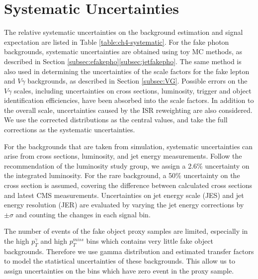 \documentclass[thesis.tex]{subfiles}
\renewcommand\_{\textunderscore\allowbreak}
\begin{document}
\section{Systematic Uncertainties}
The relative systematic uncertainties on the background estimation and signal expectation are listed in Table \ref{table:ch4-systematic}. For the fake photon backgrounds, systematic uncertainties are obtained using toy MC methods, as described in Section \ref{subsec:efakepho}\ref{subsec:jetfakepho}. The same method is also used in determining the uncertainties of the scale factors for the fake lepton and $V\gamma$ backgrounds, as described in Section \ref{subsec:VG}. Possible errors on the $V\gamma$ scales, including uncertainties on cross sections, luminosity, trigger and object identification efficiencies, have been absorbed into the scale factors. In addition to the overall scale, uncertainties caused by the ISR reweighting are also considered. We use the corrected distributions as the central values, and take the full corrections as the systematic uncertainties.

For the backgrounds that are taken from simulation, systematic uncertainties can arise from cross sections, luminosity, and jet energy measurements.  Follow the recommendation of the luminosity study group, we assign a 2.6\% uncertainty on the integrated luminosity. For the rare background, a 50\% uncertainty on the cross section is assumed, covering the difference between calculated cross sections and latest CMS measurements. Uncertainties on jet energy scale (JES) and jet energy resolution (JER) are evaluated by varying the jet energy corrections by $\pm\sigma$ and counting the changes in each signal bin.

The number of events of the fake object proxy samples are limited, especially in the high $p_T^{\gamma}$ and high $p_T^{miss}$ bins which contains very little fake object backgrounds. Therefore we use gamma distribution and estimated transfer factors to model the statistical uncertainties of these backgrounds. This allow us to assign uncertainties on the bins which have zero event in the proxy sample. 
\end{document}
